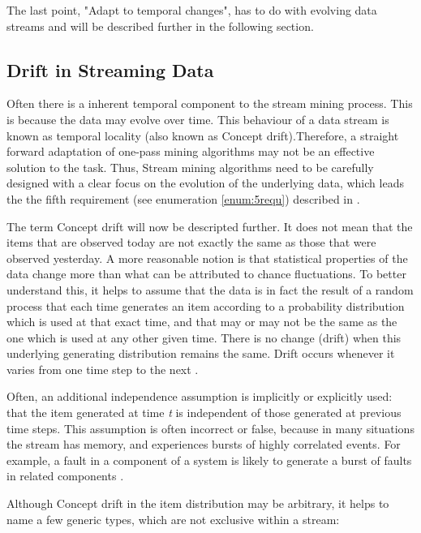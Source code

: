 \documentclass[12pt,oneside,a4paper,parskip]{scrbook}
\begin{document}
The last point, "Adapt to temporal changes", has to do with evolving data streams and will be described further in the following 
section.

\subsection{Drift in Streaming Data}
Often there is a inherent temporal component to the stream mining process. This is because the data may evolve over time. 
This behaviour of a data stream is known as temporal locality\cite{aggarwal2007data} (also known as Concept drift)\cite{MLonDataStreams}.Therefore, 
a straight forward adaptation of one-pass mining algorithms may not be an effective solution to the task.
Thus, Stream mining algorithms need to be carefully designed with a clear focus on the evolution of the underlying data, 
which leads the the fifth requirement (see enumeration \ref{enum:5requ}) described in \cite{MLonDataStreams}.

The term Concept drift will now be descripted further.
It does not mean that the items that are observed today are not exactly the same as those that were observed yesterday. 
A more reasonable notion is that statistical properties of the data change more than what can be attributed to chance
fluctuations. To better understand this, it helps to assume that the data is in fact the result of a random process that
each time generates an item according to a probability distribution which is used at that exact time, and that may or 
may not be the same as the one which is used at any other given time. There is no change (drift) when this underlying generating distribution
remains the same. Drift occurs whenever it varies from one time step to the next \cite{MLonDataStreams}.

Often, an additional independence assumption is implicitly or explicitly used: that the item generated at time \textit{t} is 
independent of those generated at previous time steps. This assumption is often incorrect or false, because in many 
situations the stream has memory, and experiences bursts of highly correlated events. For example, a fault in a 
component of a system is likely to generate a burst of faults in related components \cite{MLonDataStreams}. 

Although Concept drift in the item distribution may be arbitrary, it helps to name a few generic types, 
which are not exclusive within a stream:
\end{document}
